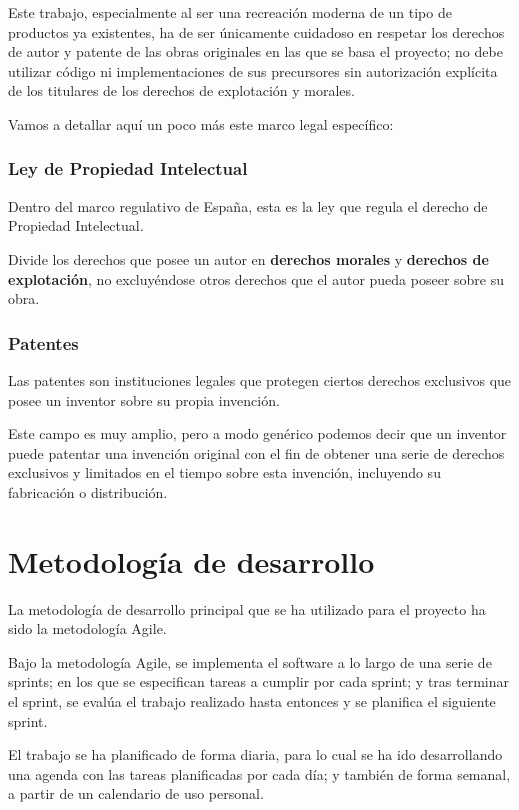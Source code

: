 \documentclass[12pt,a4paper,twoside,openright]{book}
\begin{document}
Este trabajo, especialmente al ser una recreación moderna de un tipo de productos ya existentes, ha de ser únicamente cuidadoso en respetar los derechos de autor y patente de las obras originales en las que se basa el proyecto; no debe utilizar código ni implementaciones de sus precursores sin autorización explícita de los titulares de los derechos de explotación y morales. \cite{apuntespropiedadintelectual}

Vamos a detallar aquí un poco más este marco legal específico:

\subsubsection{Ley de Propiedad Intelectual} 

Dentro del marco regulativo de España, esta es la ley que regula el derecho de Propiedad Intelectual. \cite{BOE1996a}

Divide los derechos que posee un autor en \textbf{derechos morales} y \textbf{derechos de explotación}, no excluyéndose otros derechos que el autor pueda poseer sobre su obra.

\subsubsection{Patentes}

Las patentes son instituciones legales que protegen ciertos derechos exclusivos que posee un inventor sobre su propia invención.

Este campo es muy amplio, pero a modo genérico podemos decir que un inventor puede patentar una invención original con el fin de obtener una serie de derechos exclusivos y limitados en el tiempo sobre esta invención, incluyendo su fabricación o distribución.

\section{Metodología de desarrollo}

La metodología de desarrollo principal que se ha utilizado para el proyecto ha sido la metodología Agile.

Bajo la metodología Agile, se implementa el software a lo largo de una serie de sprints; en los que se especifican tareas a cumplir
por cada sprint; y tras terminar el sprint, se evalúa el trabajo realizado hasta entonces y se planifica el siguiente sprint.

El trabajo se ha planificado de forma diaria, para lo cual se ha ido desarrollando una agenda con las tareas planificadas por cada día;
y también de forma semanal, a partir de un calendario de uso personal.
\end{document}
